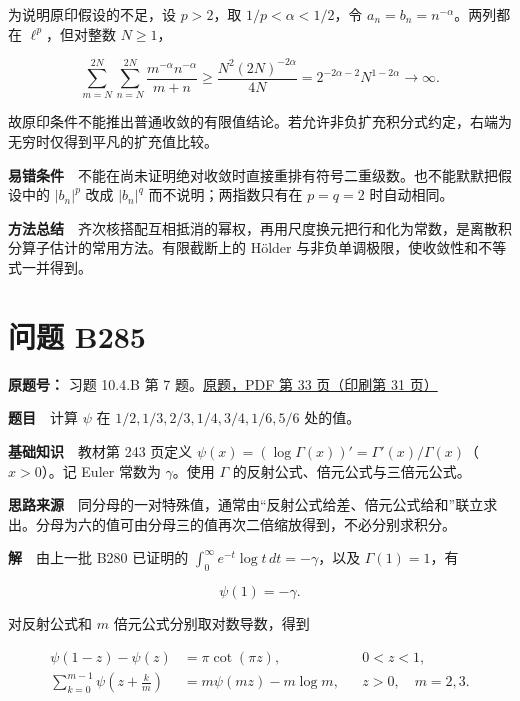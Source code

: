\documentclass[11pt,a4paper]{article}
\begin{document}
为说明原印假设的不足，设 \(p>2\)，取 \(1/p<\alpha<1/2\)，令
\(a_n=b_n=n^{-\alpha}\)。两列都在 \(\ell^p\)，但对整数 \(N\ge1\)，

\begin{equation}
\sum_{m=N}^{2N}\sum_{n=N}^{2N}
\frac{m^{-\alpha}n^{-\alpha}}{m+n}
\ge\frac{N^2(2N)^{-2\alpha}}{4N}
=2^{-2\alpha-2}N^{1-2\alpha}\longrightarrow\infty.
\tag{13}
\end{equation}

故原印条件不能推出普通收敛的有限值结论。若允许非负扩充积分式约定，右端为无穷时仅得到平凡的扩充值比较。

\textbf{易错条件}　不能在尚未证明绝对收敛时直接重排有符号二重级数。也不能默默把假设中的
\(|b_n|^p\) 改成 \(|b_n|^q\) 而不说明；两指数只有在 \(p=q=2\)
时自动相同。

\textbf{方法总结}　齐次核搭配互相抵消的幂权，再用尺度换元把行和化为常数，是离散积分算子估计的常用方法。有限截断上的
Hölder 与非负单调极限，使收敛性和不等式一并得到。

\section{问题 B285}\label{ux95eeux9898-b285}

\textbf{原题号：} 习题 10.4.B 第 7
题。\href{https://zj139.github.io/math-notes/files/problems/楼分析习题-v2.pdf\#page=33}{原题，PDF
第 33 页（印刷第 31 页）}

\textbf{题目}　计算 \(\psi\) 在 \(1/2,1/3,2/3,1/4,3/4,1/6,5/6\) 处的值。

\textbf{基础知识}　教材第 243 页定义
\(\psi(x)=(\log\Gamma(x))'=\Gamma'(x)/\Gamma(x)\)（\(x>0\)）。记 Euler
常数为 \(\gamma\)。使用 \(\Gamma\) 的反射公式、倍元公式与三倍元公式。

\textbf{思路来源}　同分母的一对特殊值，通常由``反射公式给差、倍元公式给和''联立求出。分母为六的值可由分母三的值再次二倍缩放得到，不必分别求积分。

\textbf{解}　由上一批 B280 已证明的
\(\int_0^\infty e^{-t}\log t\,dt=-\gamma\)，以及 \(\Gamma(1)=1\)，有

\begin{equation}
\psi(1)=-\gamma.
\tag{14}
\end{equation}

对反射公式和 \(m\) 倍元公式分别取对数导数，得到

\begin{equation}
\begin{aligned}
\psi(1-z)-\psi(z)&=\pi\cot(\pi z),&&0<z<1,\\
\sum_{k=0}^{m-1}\psi\left(z+\frac{k}{m}\right)
&=m\psi(mz)-m\log m,&&z>0,\quad m=2,3.
\end{aligned}
\tag{15}
\end{equation}
\end{document}
